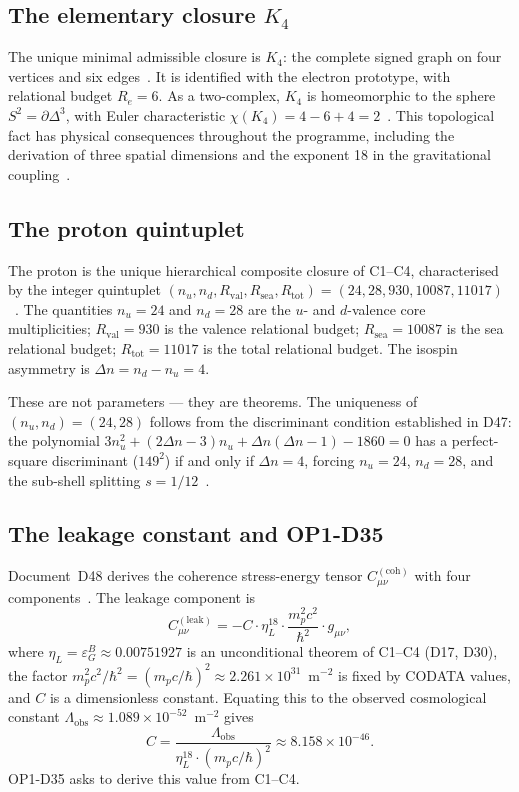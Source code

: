 \documentclass[12pt,a4paper]{article}
\newcommand{\Kfour}{K_4}
\newcommand{\hb}{\hbar}
\newcommand{\Rtot}{R_{\mathrm{tot}}}
\newcommand{\Rval}{R_{\mathrm{val}}}
\newcommand{\Rsea}{R_{\mathrm{sea}}}
\renewcommand{\Re}{R_e}
\newcommand{\etaL}{\eta_L}
\newcommand{\Dn}{\Delta n}
\newcommand{\Lam}{\Lambda}
\begin{document}
\subsection{The elementary closure \texorpdfstring{$\Kfour$}{K4}}

The unique minimal admissible closure is $\Kfour$: the complete signed graph on four vertices and six edges~\cite{PDL_D16a_2026}. It is identified with the electron prototype, with relational budget $\Re = 6$. As a two-complex, $\Kfour$ is homeomorphic to the sphere $S^2 = \partial\Delta^3$, with Euler characteristic $\chi(\Kfour) = 4 - 6 + 4 = 2$~\cite{PDL_D23_2026}. This topological fact has physical consequences throughout the programme, including the derivation of three spatial dimensions and the exponent 18 in the gravitational coupling~\cite{PDL_D23_2026}.

\subsection{The proton quintuplet}

The proton is the unique hierarchical composite closure of C1--C4, characterised by the integer quintuplet $(n_u, n_d, \Rval, \Rsea, \Rtot) = (24, 28, 930, 10087, 11017)$~\cite{PDL_D16b_2026,PDL_D29_2026}. The quantities $n_u = 24$ and $n_d = 28$ are the $u$- and $d$-valence core multiplicities; $\Rval = 930$ is the valence relational budget; $\Rsea = 10087$ is the sea relational budget; $\Rtot = 11017$ is the total relational budget. The isospin asymmetry is $\Dn = n_d - n_u = 4$.

These are not parameters — they are theorems. The uniqueness of $(n_u, n_d) = (24, 28)$ follows from the discriminant condition established in D47: the polynomial $3n_u^2 + (2\Dn-3)n_u + \Dn(\Dn-1) - 1860 = 0$ has a perfect-square discriminant ($149^2$) if and only if $\Dn = 4$, forcing $n_u = 24$, $n_d = 28$, and the sub-shell splitting $s = 1/12$~\cite{PDL_D47_2026}.

\subsection{The leakage constant and OP1-D35}

Document~D48 derives the coherence stress-energy tensor $C_{\mu\nu}^{(\mathrm{coh})}$ with four components~\cite{PDL_D48_2026}. The leakage component is
\begin{equation}
C^{(\mathrm{leak})}_{\mu\nu} = -C \cdot \etaL^{18} \cdot \frac{m_p^2 c^2}{\hb^2} \cdot g_{\mu\nu},
\label{eq:Cleak}
\end{equation}
where $\etaL = \varepsilon_G^B \approx 0.00751927$ is an unconditional theorem of C1--C4 (D17, D30), the factor $m_p^2c^2/\hb^2 = (m_p c/\hb)^2 \approx 2.261 \times 10^{31}$~m$^{-2}$ is fixed by CODATA values, and $C$ is a dimensionless constant. Equating this to the observed cosmological constant $\Lam_{\mathrm{obs}} \approx 1.089 \times 10^{-52}$~m$^{-2}$ gives
\begin{equation}
C = \frac{\Lam_{\mathrm{obs}}}{\etaL^{18} \cdot (m_p c/\hb)^2} \approx 8.158 \times 10^{-46}.
\label{eq:Ctarget}
\end{equation}
OP1-D35 asks to derive this value from C1--C4.
\end{document}

